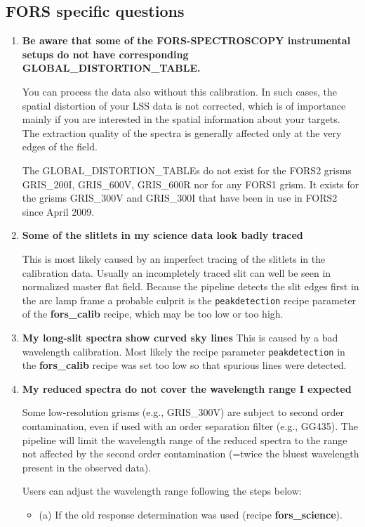 \subsection{FORS specific questions}
\label{sec:faq_fors}

\begin{enumerate}
\item {\bf Be aware that some of the FORS-SPECTROSCOPY instrumental setups do not have corresponding GLOBAL\_DISTORTION\_TABLE.} 

You can process the data also without this calibration. In such cases, the spatial distortion of your LSS data is not corrected, which is of importance mainly if you are interested in the spatial
information about your targets. The extraction quality of the spectra is generally affected only at the very edges of the field.

The GLOBAL\_DISTORTION\_TABLEs do not exist for the FORS2 grisms GRIS\_200I, GRIS\_600V, GRIS\_600R nor for any FORS1 grism. It exists for the grisms GRIS\_300V and GRIS\_300I that have been in use in FORS2 since April 2009.

\item {\bf Some of the slitlets in my science data look badly traced}

This is most likely caused by an imperfect tracing of the slitlets in the calibration data. Usually an incompletely traced slit can well be seen in normalized master flat field. Because the pipeline detects the
slit edges first in the arc lamp frame a probable culprit is the {\tt peakdetection} recipe parameter of the {\bf fors\_calib} recipe, which may be too low or too high.

\item {\bf My long-slit spectra show curved sky lines}
This is caused by a bad wavelength calibration. Most likely the recipe parameter {\tt peakdetection} in the {\bf fors\_calib} recipe was set too low so that spurious lines were detected.

\item {\bf My reduced spectra do not cover the wavelength range I expected}

Some low-resolution grisms (e.g., GRIS\_300V) are subject to second order contamination, even if used with an order separation filter (e.g., GG435). The pipeline will limit the wavelength range of the reduced spectra to the range not affected by the second order contamination (=twice the bluest wavelength present
in the observed data).

Users can adjust the wavelength range following the steps below:
\begin{itemize}
    \item (a) If the old response determination was used (recipe {\bf fors\_science}).


\end{itemize}
\end{enumerate}
